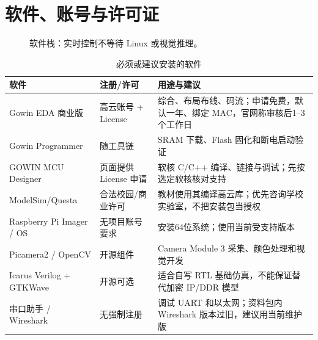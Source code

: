 \documentclass[UTF8,a4paper,zihao=-4,fontset=fandol]{ctexart}
\begin{document}
\section{软件、账号与许可证}\label{sec:software}

\begin{figure}[H]\centering
{}
\caption{软件栈：实时控制不等待 Linux 或视觉推理。}
\end{figure}

\begin{table}[H]\small
\caption{必须或建议安装的软件}\label{tab:software}
\begin{tabularx}{\linewidth}{@{}L{3.4cm}L{2.4cm}Y@{}}\toprule
\textbf{软件} & \textbf{注册/许可} & \textbf{用途与建议}\\\midrule
Gowin EDA 商业版 & 高云账号 + License & 综合、布局布线、码流；申请免费，默认一年、绑定 MAC，官网称审核后1--3个工作日\cite{gowineda}\\
Gowin Programmer & 随工具链 & SRAM 下载、Flash 固化和断电启动验证\\
GOWIN MCU Designer & 页面提供 License 申请 & 软核 C/C++ 编译、链接与调试；先按选定软核核对支持\cite{gmd}\\
ModelSim/Questa & 合法校园/商业许可 & 教材使用其编译高云库；优先咨询学校实验室，不把安装包当授权\\
Raspberry Pi Imager / OS & 无项目账号要求 & 安装64位系统；使用当前受支持版本\cite{pi5}\\
Picamera2 / OpenCV & 开源组件 & Camera Module 3 采集、颜色处理和视觉开发\cite{picam}\\
Icarus Verilog + GTKWave & 开源可选 & 适合自写 RTL 基础仿真，不能保证替代加密 IP/DDR 模型\\
串口助手 / Wireshark & 无强制注册 & 调试 UART 和以太网；资料包内 Wireshark 版本过旧，建议用当前维护版\\\bottomrule
\end{tabularx}
\end{table}
\end{document}
